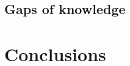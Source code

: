 \documentclass[authoryear]{elsarticle}
\begin{document}
\subsection{Gaps of knowledge}

\section{Conclusions}

%
%
%
\end{document}
